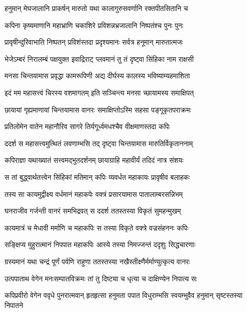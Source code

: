 \twolineshloka
{हनुमान् मेघजालानि प्राकर्षन् मारुतो यथा}
{कालागुरुसवर्णानि रक्तपीतसितानि च} %

\twolineshloka
{कपिना कृष्यमाणानि महाभ्राणि चकाशिरे}
{प्रविशन्नभ्रजालानि निष्पतंश्च पुनः पुनः} %

\twolineshloka
{प्रावृषीन्दुरिवाभाति निष्पतन् प्रविशंस्तदा}
{प्रदृश्यमानः सर्वत्र हनूमान् मारुतात्मजः} %

\twolineshloka
{भेजेऽम्बरं निरालम्बं पक्षयुक्त इवाद्रिराट्}
{प्लवमानं तु तं दृष्ट्वा सिंहिका नाम राक्षसी} %

\twolineshloka
{मनसा चिन्तयामास प्रवृद्धा कामरूपिणी}
{अद्य दीर्घस्य कालस्य भविष्याम्यहमाशिता} %

\twolineshloka
{इदं मम महासत्त्वं चिरस्य वशमागतम्}
{इति सञ्चिन्त्य मनसा च्छायामस्य समाक्षिपत्} %

\twolineshloka
{छायायां गृह्यमाणायां चिन्तयामास वानरः}
{समाक्षिप्तोऽस्मि सहसा पङ्गूकृतपराक्रमः} %

\twolineshloka
{प्रतिलोमेन वातेन महानौरिव सागरे}
{तिर्यगूर्ध्वमधश्चैव वीक्षमाणस्तदा कपिः} %

\twolineshloka
{ददर्श स महासत्त्वमुत्थितं लवणाम्भसि}
{तद् दृष्ट्वा चिन्तयामास मारुतिर्विकृताननाम्} %

\twolineshloka
{कपिराज्ञा यथाख्यातं सत्त्वमद्भुतदर्शनम्}
{छायाग्राहि महावीर्यं तदिदं नात्र संशयः} %

\twolineshloka
{स तां बुद्ध्वार्थतत्त्वेन सिंहिकां मतिमान् कपिः}
{व्यवर्धत महाकायः प्रावृषीव बलाहकः} %

\twolineshloka
{तस्य सा कायमुद्वीक्ष्य वर्धमानं महाकपेः}
{वक्त्रं प्रसारयामास पातालाम्बरसन्निभम्} %

\twolineshloka
{घनराजीव गर्जन्ती वानरं समभिद्रवत्}
{स ददर्श ततस्तस्या विकृतं सुमहन्मुखम्} %

\twolineshloka
{कायमात्रं च मेधावी मर्माणि च महाकपिः}
{स तस्या विकृते वक्त्रे वज्रसंहननः कपिः} %

\twolineshloka
{सङ्क्षिप्य मुहुरात्मानं निपपात महाकपिः}
{आस्ये तस्या निमज्जन्तं ददृशुः सिद्धचारणाः} %

\twolineshloka
{ग्रस्यमानं यथा चन्द्रं पूर्णं पर्वणि राहुणा}
{ततस्तस्या नखैस्तीक्ष्णैर्मर्माण्युत्कृत्य वानरः} %

\twolineshloka
{उत्पपाताथ वेगेन मनःसम्पातविक्रमः}
{तां तु दिष्ट्या च धृत्या च दाक्षिण्येन निपात्य सः} %

\threelineshloka
{कपिप्रवीरो वेगेन ववृधे पुनरात्मवान्}
{हृतहृत्सा हनुमता पपात विधुराम्भसि}
{स्वयम्भुवैव हनुमान् सृष्टस्तस्या निपातने} %

